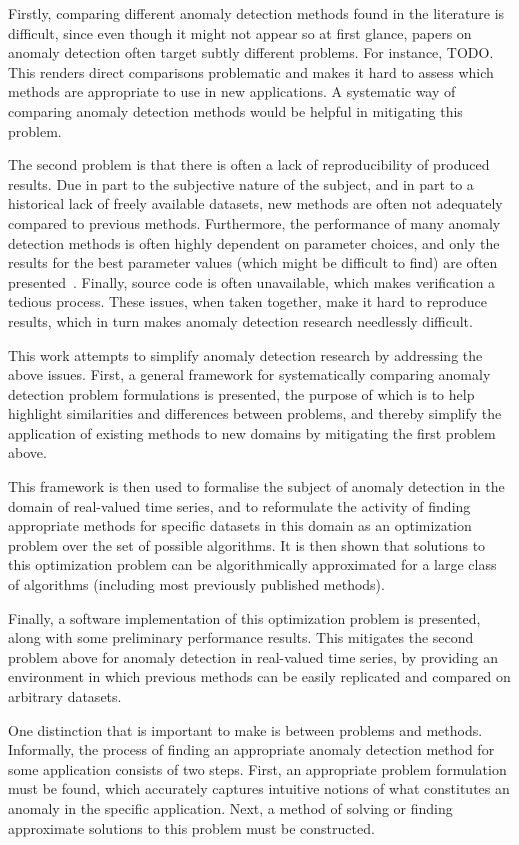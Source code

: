 Firstly, comparing different anomaly detection methods found in the literature is difficult, since even though it might not appear so at first glance, papers on anomaly detection often target subtly different problems. For instance, TODO. This renders direct comparisons problematic and makes it hard to assess which methods are appropriate to use in new applications. A systematic way of comparing anomaly detection methods would be helpful in mitigating this problem.

The second problem is that there is often a lack of reproducibility of produced results. Due in part to the subjective nature of the subject, and in part to a historical lack of freely available datasets, new methods are often not adequately compared to previous methods. Furthermore, the performance of many anomaly detection methods is often highly dependent on parameter choices, and only the results for the best parameter values (which might be difficult to find) are often presented~\cite{keogh5}. Finally, source code is often unavailable, which makes verification a tedious process. These issues, when taken together, make it hard to reproduce results, which in turn makes anomaly detection research needlessly difficult.

This work attempts to simplify anomaly detection research by addressing the above issues. First, a general framework for systematically comparing anomaly detection problem formulations is presented, the purpose of which is to help highlight similarities and differences between problems, and thereby simplify the application of existing methods to new domains by mitigating the first problem above.

This framework is then used to formalise the subject of anomaly detection in the domain of real-valued time series, and to reformulate the activity of finding appropriate methods for specific datasets in this domain as an optimization problem over the set of possible algorithms. It is then shown that solutions to this optimization problem can be algorithmically approximated for a large class of algorithms (including most previously published methods).

Finally, a software implementation of this optimization problem is presented, along with some preliminary performance results. This mitigates the second problem above for anomaly detection in real-valued time series, by providing an environment in which previous methods can be easily replicated and compared on arbitrary datasets.

One distinction that is important to make is between problems and methods. Informally, the process of finding an appropriate anomaly detection method for some application consists of two steps. First, an appropriate problem formulation must be found, which accurately captures intuitive notions of what constitutes an anomaly in the specific application. Next, a method of solving or finding approximate solutions to this problem must be constructed.

